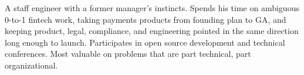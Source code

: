 %
%
%
\par{
A staff engineer with a former manager's instincts. Spends his time on ambiguous 0-to-1 fintech work, taking payments products from founding plan to GA, and keeping product, legal, compliance, and engineering pointed in the same direction long enough to launch. Participates in open source development and technical conferences. Most valuable on problems that are part technical, part organizational.
}